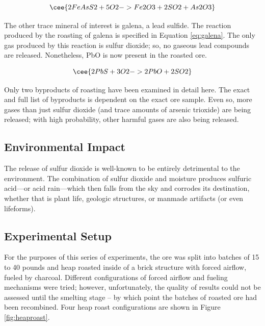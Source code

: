 \begin{equation}
\label{eq:arsenopyrite}
\cee{2FeAsS2 + 5O2 -> Fe2O3 + 2SO2 + As2O3}
\end{equation}

The other trace mineral of interest is galena, a lead sulfide.  The reaction
produced by the roasting of galena is specified in Equation \ref{eq:galena}.
The only gas produced by this reaction is sulfur dioxide; so, no gaseous lead
compounds are released.  Nonetheless, PbO is now present in the roasted ore.

\begin{equation}
\label{eq:galena}
\cee{2PbS + 3O2 -> 2PbO + 2SO2}
\end{equation}

Only two byproducts of roasting have been examined in detail here.  The exact
and full list of byproducts is dependent on the exact ore sample.  Even so, more
gases than just sulfur dioxide (and trace amounts of arsenic trioxide) are being
released; with high probability, other harmful gases are also being released.

\subsection{Environmental Impact}

The release of sulfur dioxide is well-known to be entirely detrimental to the
environment.  The combination of sulfur dioxide and moisture produces sulfuric
acid---or acid rain---which then falls from the sky and corrodes its
destination, whether that is plant life, geologic structures, or manmade
artifacts (or even lifeforms).


\subsection{Experimental Setup}

For the purposes of this series of experiments, the ore was split into batches
of 15 to 40 pounds and heap roasted inside of a brick structure with forced
airflow, fueled by charcoal.  Different configurations of forced airflow and
fueling mechanisms were tried; however, unfortunately, the quality of results
could not be assessed until the smelting stage -- by which point the batches of
roasted ore had been recombined.  Four heap roast configurations are shown in
Figure \ref{fig:heaproast}.

